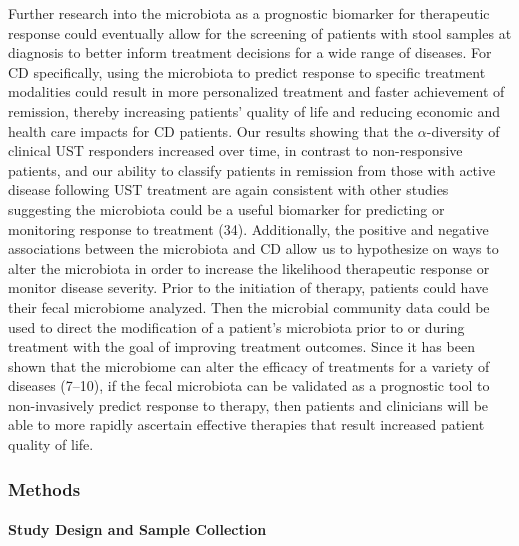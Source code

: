 \documentclass[12pt,]{article}
\let\oldparagraph\paragraph
\renewcommand{\paragraph}[1]{\oldparagraph{#1}\mbox{}}
\begin{document}
Further research into the microbiota as a prognostic biomarker for
therapeutic response could eventually allow for the screening of
patients with stool samples at diagnosis to better inform treatment
decisions for a wide range of diseases. For CD specifically, using the
microbiota to predict response to specific treatment modalities could
result in more personalized treatment and faster achievement of
remission, thereby increasing patients' quality of life and reducing
economic and health care impacts for CD patients. Our results showing
that the \({\alpha}\)-diversity of clinical UST responders increased
over time, in contrast to non-responsive patients, and our ability to
classify patients in remission from those with active disease following
UST treatment are again consistent with other studies suggesting the
microbiota could be a useful biomarker for predicting or monitoring
response to treatment (34). Additionally, the positive and negative
associations between the microbiota and CD allow us to hypothesize on
ways to alter the microbiota in order to increase the likelihood
therapeutic response or monitor disease severity. Prior to the
initiation of therapy, patients could have their fecal microbiome
analyzed. Then the microbial community data could be used to direct the
modification of a patient's microbiota prior to or during treatment with
the goal of improving treatment outcomes. Since it has been shown that
the microbiome can alter the efficacy of treatments for a variety of
diseases (7--10), if the fecal microbiota can be validated as a
prognostic tool to non-invasively predict response to therapy, then
patients and clinicians will be able to more rapidly ascertain effective
therapies that result increased patient quality of life.

\newpage

\subsubsection{Methods}\label{methods}

\paragraph{Study Design and Sample
Collection}\label{study-design-and-sample-collection}
\end{document}

